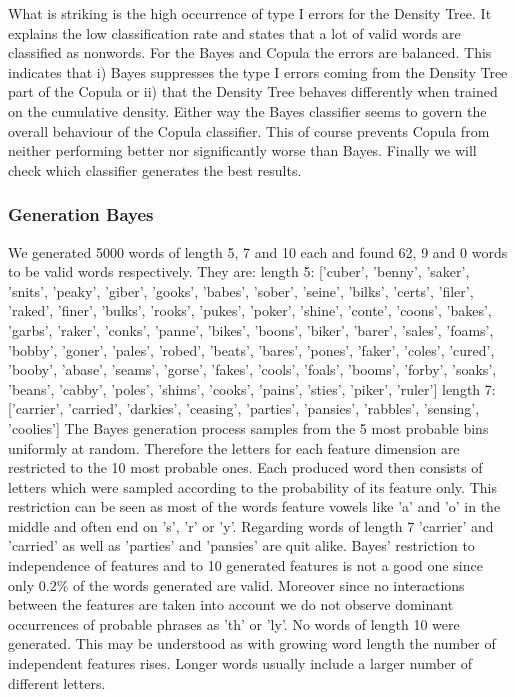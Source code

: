 \documentclass[draft]{article}
\begin{document}
What is striking is the high occurrence of type I errors for the Density Tree.
It explains the low classification rate and states that a lot of valid words are classified as nonwords.
For the Bayes and Copula the errors are balanced. This indicates that i) Bayes suppresses the type I errors
coming from the Density Tree part of the Copula or ii) that the Density Tree behaves differently
when trained on the cumulative density.
Either way the Bayes classifier seems to govern the overall behaviour of the Copula classifier.
This of course prevents Copula from neither performing better nor significantly worse than Bayes.
\newline
Finally we will check which classifier generates the best results.

\subsubsection{Generation Bayes}
We generated 5000 words of length 5, 7 and 10 each and found 62, 9 and 0 words
to be valid words respectively. They are:
\newline
\newline
length 5: ['cuber', 'benny', 'saker', 'snits', 'peaky', 'giber', 'gooks', 'babes', 'sober', 'seine', 'bilks', 'certs', 'filer', 'raked', 'finer', 'bulks', 'rooks', 'pukes', 'poker', 'shine', 'conte', 'coons', 'bakes', 'garbs', 'raker', 'conks', 'panne', 'bikes', 'boons', 'biker', 'barer', 'sales', 'foams', 'bobby', 'goner', 'pales', 'robed', 'beats', 'bares', 'pones', 'faker', 'coles', 'cured', 'booby', 'abase', 'seams', 'gorse', 'fakes', 'cools', 'foals', 'booms', 'forby', 'soaks', 'beans', 'cabby', 'poles', 'shims', 'cooks', 'pains', 'sties', 'piker', 'ruler']
\newline
\newline
length 7: ['carrier', 'carried', 'darkies', 'ceasing', 'parties', 'pansies', 'rabbles', 'sensing', 'coolies']
\newline
\newline
The Bayes generation process samples from the 5 most probable bins uniformly at random.
Therefore the letters for each feature dimension are restricted to the 10 most probable ones.
Each produced word then consists of letters which were sampled according to the
probability of its feature only.
This restriction can be seen as most of the words
feature vowels like 'a' and 'o' in the middle and often end on 's', 'r' or 'y'.
\newline
Regarding words of length 7 'carrier' and 'carried' as well as 'parties' and 'pansies'
are quit alike. Bayes' restriction to independence of features and to 10 generated
features is not a good one since only $0.2\%$ of the words generated are valid.
Moreover since no interactions between the features are taken into account
we do not observe dominant occurrences of probable phrases as 'th' or 'ly'.
\newline
No words of length 10 were generated. This may be understood as
with growing word length the number of independent features rises.
Longer words usually include a larger number of different letters.
\end{document}
